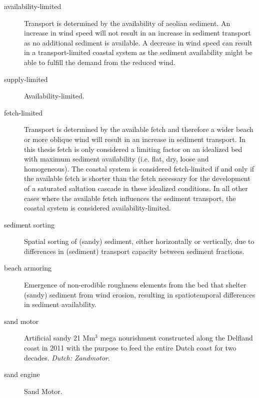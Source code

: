 \begin{description}
\item[availability-limited] Transport is determined by the
  availability of aeolian sediment. An increase in wind speed will not
  result in an increase in sediment transport as no additional
  sediment is available. A decrease in wind speed can result in a
  transport-limited coastal system as the sediment availability might
  be able to fulfill the demand from the reduced wind.
\item[supply-limited] Availability-limited.
\item[fetch-limited] Transport is determined by the available fetch
  and therefore a wider beach or more oblique wind will result in an
  increase in sediment transport. In this thesis fetch is only
  considered a limiting factor on an idealized bed with maximum
  sediment availability (i.e. flat, dry, loose and homogeneous). The
  coastal system is considered fetch-limited if and only if the
  available fetch is shorter than the fetch necessary for the
  development of a saturated saltation cascade in these idealized
  conditions. In all other cases where the available fetch influences
  the sediment transport, the coastal system is considered
  availability-limited.
\item[sediment sorting] Spatial sorting of (sandy) sediment, either
  horizontally or vertically, due to differences in (sediment)
  transport capacity between sediment fractions.
\item[beach armoring] Emergence of non-erodible roughness elements
  from the bed that shelter (sandy) sediment from wind erosion,
  resulting in spatiotemporal differences in sediment availability.
\item[sand motor] Artificial sandy 21 $\mathrm{Mm^3}$ mega nourishment
  constructed along the Delfland coast in 2011 with the purpose to
  feed the entire Dutch coast for two decades. \emph{Dutch:
    Zandmotor}.
\item[sand engine] Sand Motor.
\end{description}

